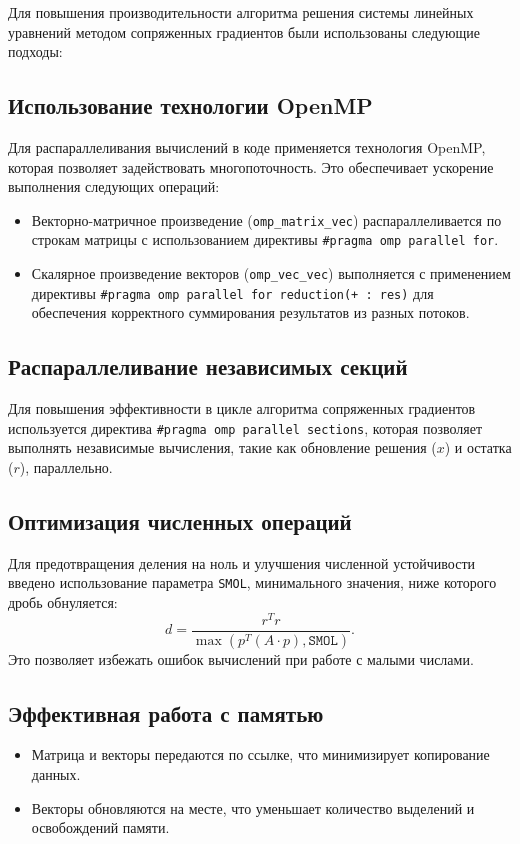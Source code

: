 \documentclass[12pt]{extarticle}
\begin{document}
\begin{spacing}{1.5}
    Для повышения производительности алгоритма решения системы линейных уравнений методом сопряженных градиентов были использованы следующие подходы:

    \subsection{Использование технологии OpenMP}
    Для распараллеливания вычислений в коде применяется технология OpenMP, которая позволяет задействовать многопоточность. Это обеспечивает ускорение выполнения следующих операций:
    \begin{itemize}
        \item Векторно-матричное произведение (\texttt{omp\_matrix\_vec}) распараллеливается по строкам матрицы с использованием директивы \texttt{\#pragma omp parallel for}.
        \item Скалярное произведение векторов (\texttt{omp\_vec\_vec}) выполняется с применением директивы \texttt{\#pragma omp parallel for reduction(+ : res)} для обеспечения корректного суммирования результатов из разных потоков.
    \end{itemize}

    \subsection{Распараллеливание независимых секций}
    Для повышения эффективности в цикле алгоритма сопряженных градиентов используется директива \texttt{\#pragma omp parallel sections}, которая позволяет выполнять независимые вычисления, такие как обновление решения (\(x\)) и остатка (\(r\)), параллельно.

    \subsection{Оптимизация численных операций}
    Для предотвращения деления на ноль и улучшения численной устойчивости введено использование параметра \texttt{SMOL}, минимального значения, ниже которого дробь обнуляется:
    \[
    d = \frac{r^T r}{\max(p^T (A \cdot p), \texttt{SMOL})}.
    \]
    Это позволяет избежать ошибок вычислений при работе с малыми числами.

    \subsection{Эффективная работа с памятью}
    \begin{itemize}
        \item Матрица и векторы передаются по ссылке, что минимизирует копирование данных.
        \item Векторы обновляются на месте, что уменьшает количество выделений и освобождений памяти.
    \end{itemize}


\end{spacing}
\end{document}
